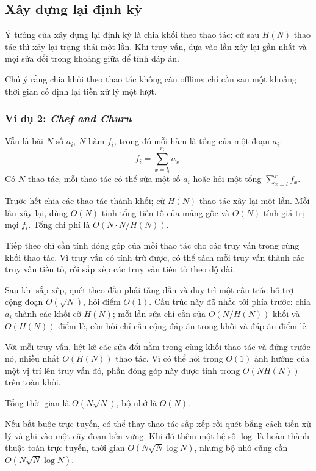 \documentclass[11pt]{article}
\begin{document}
\subsection{Xây dựng lại định kỳ}

Ý tưởng của xây dựng lại định kỳ là chia khối theo thao tác: cứ sau \(H(N)\)
thao tác thì xây lại trạng thái một lần. Khi truy vấn, dựa vào lần xây lại gần
nhất và mọi sửa đổi trong khoảng giữa để tính đáp án.

Chú ý rằng chia khối theo thao tác không cần offline; chỉ cần sau một khoảng
thời gian cố định lại tiền xử lý một lượt.

\subsubsection{\texorpdfstring{Ví dụ 2: \emph{Chef and Churu}}{Ví dụ 2: Chef and Churu}}

Vẫn là bài \(N\) số \(a_i\), \(N\) hàm \(f_i\), trong đó mỗi hàm là tổng của
một đoạn \(a_i\):
\[
  f_i=\sum_{x=l_i}^{r_i}a_x.
\]
Có \(N\) thao tác, mỗi thao tác có thể sửa một số \(a_i\) hoặc hỏi một tổng
\(\sum_{x=l}^{r}f_x\).

Trước hết chia các thao tác thành khối; cứ \(H(N)\) thao tác xây lại một lần.
Mỗi lần xây lại, dùng \(O(N)\) tính tổng tiền tố của mảng gốc và \(O(N)\) tính
giá trị mọi \(f_i\). Tổng chi phí là \(O(N\cdot N/H(N))\).

Tiếp theo chỉ cần tính đóng góp của mỗi thao tác cho các truy vấn trong cùng
khối thao tác. Vì truy vấn có tính trừ được, có thể tách mỗi truy vấn thành các
truy vấn tiền tố, rồi sắp xếp các truy vấn tiền tố theo độ dài.

Sau khi sắp xếp, quét theo đầu phải tăng dần và duy trì một cấu trúc hỗ trợ
cộng đoạn \(O(\sqrt N)\), hỏi điểm \(O(1)\). Cấu trúc này đã nhắc tới phía
trước: chia \(a_i\) thành các khối cỡ \(H(N)\); mỗi lần sửa chỉ cần sửa
\(O(N/H(N))\) khối và \(O(H(N))\) điểm lẻ, còn hỏi chỉ cần cộng đáp án trong
khối và đáp án điểm lẻ.

Với mỗi truy vấn, liệt kê các sửa đổi nằm trong cùng khối thao tác và đứng
trước nó, nhiều nhất \(O(H(N))\) thao tác. Vì có thể hỏi trong \(O(1)\) ảnh
hưởng của một vị trí lên truy vấn đó, phần đóng góp này được tính trong
\(O(NH(N))\) trên toàn khối.

Tổng thời gian là \(O(N\sqrt N)\), bộ nhớ là \(O(N)\).

Nếu bắt buộc trực tuyến, có thể thay thao tác sắp xếp rồi quét bằng cách tiền xử
lý và ghi vào một cây đoạn bền vững. Khi đó thêm một hệ số \(\log\) là hoàn
thành thuật toán trực tuyến, thời gian \(O(N\sqrt N\log N)\), nhưng bộ nhớ cũng
cần \(O(N\sqrt N\log N)\).
\end{document}
